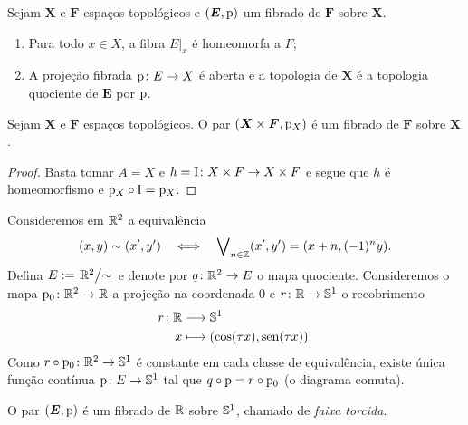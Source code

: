 \begin{proposition}
Sejam $\bm X$ e $\bm F$ espaços topológicos e $(\bm E,\proj)$ um fibrado de $\bm F$ sobre $\bm X$.
	\begin{enumerate}
	\item Para todo $x \in X$, a fibra $E|_x$ é homeomorfa a $F$;
	\item A projeção fibrada $\proj\colon E \to X$ é aberta e a topologia de $\bm X$ é a topologia quociente de $\bm E$ por $\proj$.
	\end{enumerate}
\end{proposition}

\begin{proposition}
Sejam $\bm X$ e $\bm F$ espaços topológicos. O par $(\bm X \times \bm F,\proj_X)$ é um fibrado de $\bm F$ sobre $\bm X$.
\end{proposition}
\begin{proof}
Basta tomar $A=X$ e $h= \Id\colon X \times F \to X \times F$ e segue que $h$ é homeomorfismo e $\proj_X \circ \Id = \proj_X$.
\end{proof}

\begin{example}
Consideremos em $\R^2$ a equivalência
	\begin{equation*}
	(x,y) \sim (x',y') \sse \exists_{n \in \Z} (x',y') = (x+n,(-1)^n y).
	\end{equation*}
Defina $E := \quo{\R^2}{\sim}$ e denote por $q\colon \R^2 \to E$ o mapa quociente. Consideremos o mapa $\proj_0\colon \R^2 \to \R$ a projeção na coordenada $0$ e $r\colon \R \to \S^1$ o recobrimento
	\begin{align*}
	\func{r}{\R}{\S^1}{x}{(\cos(\tau x),\sin(\tau x))}.
	\end{align*}
Como $r \circ \proj_0\colon \R^2 \to \S^1$ é constante em cada classe de equivalência, existe única função contínua $\proj\colon E \to \S^1$ tal que $q \circ \proj = r \circ \proj_0$ (o diagrama comuta).
\begin{figure}
\centering
{}
\end{figure}
O par $(\bm E,\proj)$ é um fibrado de $\R$ sobre $\S^1$, chamado de \emph{faixa torcida}.
\end{example}

